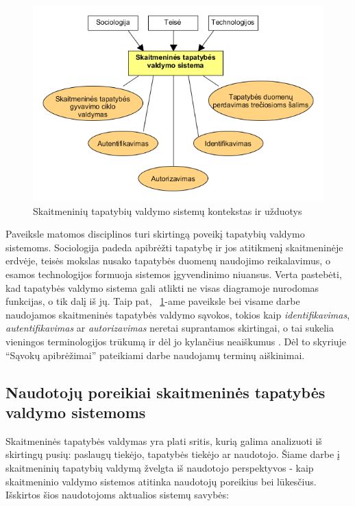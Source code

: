 \begin{figure}[H]
    \centering
    \includegraphics[scale=0.8]{img/IDMcontextAndUsecases}
    \caption{Skaitmeninių tapatybių valdymo sistemų kontekstas ir užduotys \cite{Glasser2009}}
    \label{fig:IDMContext}
\end{figure}

Paveiksle matomos disciplinos turi skirtingą poveikį tapatybių valdymo sistemoms. 
Sociologija padeda apibrėžti tapatybę ir jos atitikmenį skaitmeninėje erdvėje, teisės mokslas nusako tapatybės duomenų naudojimo reikalavimus,
o esamos technologijos formuoja sistemos įgyvendinimo niuansus. Verta pastebėti, kad tapatybės valdymo sistema gali atlikti ne visas
diagramoje nurodomas funkcijas, o tik dalį iš jų. Taip pat, ~\ref{fig:IDMContext}-ame paveiksle bei visame darbe naudojamos skaitmeninės tapatybės valdymo sąvokos,
tokios kaip \textit{identifikavimas}, \textit{autentifikavimas} ar \textit{autorizavimas} neretai suprantamos skirtingai, o tai sukelia
vieningos terminologijos trūkumą ir dėl jo kylančius neaiškumus \cite{Glasser2009}. Dėl to skyriuje
\enquote{Sąvokų apibrėžimai} pateikiami darbe naudojamų terminų aiškinimai.

\subsection{Naudotojų poreikiai skaitmeninės tapatybės valdymo sistemoms} \label{section:IDMUserNeeds}

Skaitmeninės tapatybės valdymas yra plati sritis, kurią galima analizuoti iš skirtingų pusių: paslaugų tiekėjo, tapatybės tiekėjo ar naudotojo.
Šiame darbe į skaitmeninių tapatybių valdymą žvelgta iš naudotojo perspektyvos - kaip skaitmeninio valdymo sistemos atitinka naudotojų poreikius
bei lūkesčius. Išskirtos šios naudotojoms aktualios sistemų savybės:

